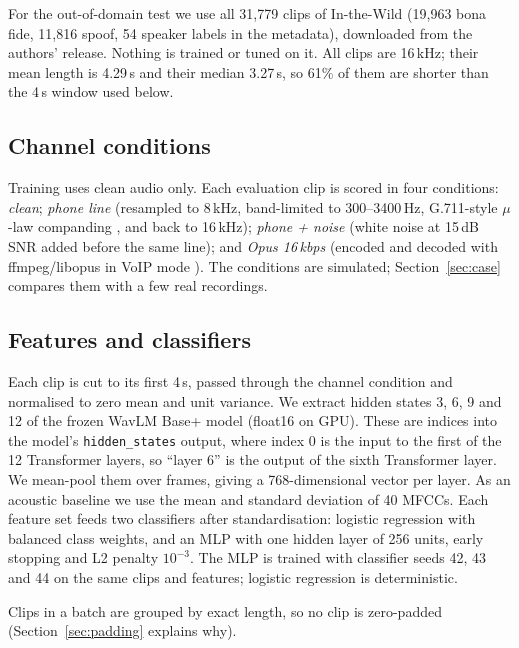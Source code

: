 \documentclass[10pt,a4paper]{article}
\begin{document}
For the out-of-domain test we use all 31,779 clips of In-the-Wild \cite{muller2022does} (19,963 bona fide, 11,816
spoof, 54 speaker labels in the metadata), downloaded from the authors' release. Nothing is trained or tuned on it.
All clips are 16\,kHz; their mean length is 4.29\,s and their median 3.27\,s, so 61\% of them are shorter than the
4\,s window used below.

\subsection{Channel conditions}
Training uses clean audio only. Each evaluation clip is scored in four conditions: \emph{clean}; \emph{phone line}
(resampled to 8\,kHz, band-limited to 300--3400\,Hz, G.711-style $\mu$-law companding \cite{itu1988g711}, and back to
16\,kHz); \emph{phone + noise} (white noise at 15\,dB SNR added before the same line); and \emph{Opus 16\,kbps} (encoded and
decoded with ffmpeg/libopus in VoIP mode \cite{rfc6716}). The conditions are simulated; Section~\ref{sec:case}
compares them with a few real recordings.

\subsection{Features and classifiers}
Each clip is cut to its first 4\,s, passed through the channel condition and normalised to zero mean and unit variance. We extract hidden states 3, 6, 9
and 12 of the frozen WavLM Base+ model \cite{chen2022wavlm} (float16 on GPU). These are indices into the
model's \texttt{hidden\_states} output, where index 0 is the input to the first of the 12 Transformer layers, so
``layer 6'' is the output of the sixth Transformer layer. We mean-pool them over frames, giving
a 768-dimensional vector per layer. As an acoustic baseline we use the mean and standard deviation of 40 MFCCs.
Each feature set feeds two classifiers after standardisation: logistic regression with balanced class weights, and an
MLP with one hidden layer of 256 units, early stopping and L2 penalty $10^{-3}$. The MLP is trained with classifier
seeds 42, 43 and 44 on the same clips and features; logistic regression is deterministic.

Clips in a batch are grouped by exact length, so no clip is zero-padded (Section~\ref{sec:padding} explains why).
\end{document}
